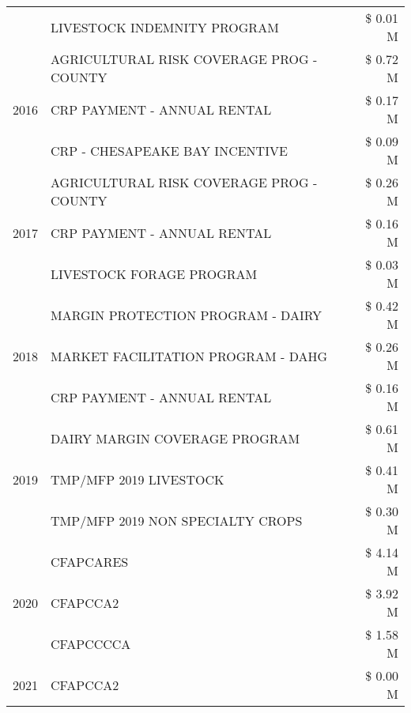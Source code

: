 \begin{tabular}{llr}
 & LIVESTOCK INDEMNITY PROGRAM & \$ 0.01 M \\
\cline{1-3}
\multirow[t]{3}{*}{2016} & AGRICULTURAL RISK COVERAGE PROG - COUNTY & \$ 0.72 M \\
 & CRP PAYMENT - ANNUAL RENTAL & \$ 0.17 M \\
 & CRP - CHESAPEAKE BAY INCENTIVE & \$ 0.09 M \\
\cline{1-3}
\multirow[t]{3}{*}{2017} & AGRICULTURAL RISK COVERAGE PROG - COUNTY & \$ 0.26 M \\
 & CRP PAYMENT - ANNUAL RENTAL & \$ 0.16 M \\
 & LIVESTOCK FORAGE PROGRAM & \$ 0.03 M \\
\cline{1-3}
\multirow[t]{3}{*}{2018} & MARGIN PROTECTION PROGRAM - DAIRY & \$ 0.42 M \\
 & MARKET FACILITATION PROGRAM - DAHG & \$ 0.26 M \\
 & CRP PAYMENT - ANNUAL RENTAL & \$ 0.16 M \\
\cline{1-3}
\multirow[t]{3}{*}{2019} & DAIRY MARGIN COVERAGE PROGRAM & \$ 0.61 M \\
 & TMP/MFP 2019 LIVESTOCK & \$ 0.41 M \\
 & TMP/MFP 2019 NON SPECIALTY CROPS & \$ 0.30 M \\
\cline{1-3}
\multirow[t]{3}{*}{2020} & CFAPCARES & \$ 4.14 M \\
 & CFAPCCA2 & \$ 3.92 M \\
 & CFAPCCCCA & \$ 1.58 M \\
\cline{1-3}
2021 & CFAPCCA2 & \$ 0.00 M \\
\cline{1-3}
\bottomrule
\end{tabular}
